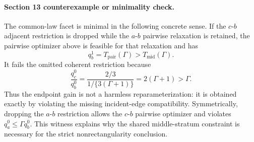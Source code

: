 \paragraph{Section 13 counterexample or minimality check.}
The common-law facet is minimal in the following concrete sense.  If the \(c\)-\(b\) adjacent restriction is dropped while the \(a\)-\(b\) pairwise relaxation is retained, the pairwise optimizer above is feasible for that relaxation and has
\[
  q_b^1=T_{\mathrm{pair}}(\Gamma)>T_{\mathrm{mid}}(\Gamma).
\]
It fails the omitted coherent restriction because
\[
  \frac{q_c^0}{q_b^0}
  =
  \frac{2/3}{1/\{3(\Gamma+1)\}}
  =
  2(\Gamma+1)>\Gamma.
\]
Thus the endpoint gain is not a harmless reparameterization: it is obtained exactly by violating the missing incident-edge compatibility.  Symmetrically, dropping the \(a\)-\(b\) restriction allows the \(c\)-\(b\) pairwise optimizer and violates \(q_a^0\le \Gamma q_b^0\).  This witness explains why the shared middle-stratum constraint is necessary for the strict nonrectangularity conclusion.
